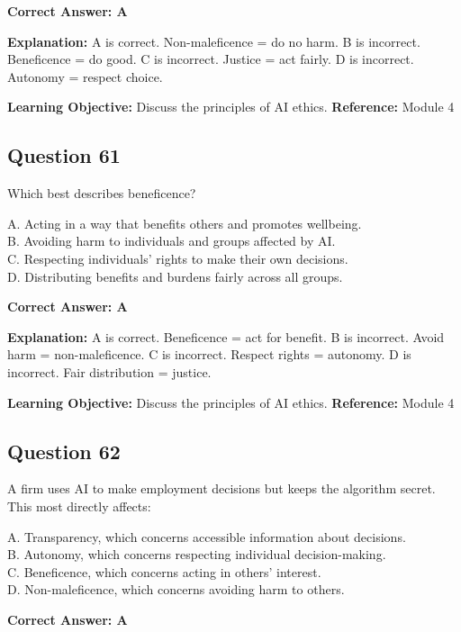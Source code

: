 \documentclass[11pt]{article}
\begin{document}
	\vspace{0.4em}
	\textbf{Correct Answer: A}
	
	\textbf{Explanation:}
	A is correct. Non-maleficence = do no harm.
	B is incorrect. Beneficence = do good.
	C is incorrect. Justice = act fairly.
	D is incorrect. Autonomy = respect choice.
	
	\textbf{Learning Objective:} Discuss the principles of AI ethics.
	\textbf{Reference:} Module 4
	
	\subsection*{Question 61}
	Which best describes beneficence?
	
	A. Acting in a way that benefits others and promotes wellbeing.\\
	B. Avoiding harm to individuals and groups affected by AI.\\
	C. Respecting individuals' rights to make their own decisions.\\
	D. Distributing benefits and burdens fairly across all groups.
	
	\vspace{0.4em}
	\textbf{Correct Answer: A}
	
	\textbf{Explanation:}
	A is correct. Beneficence = act for benefit.
	B is incorrect. Avoid harm = non-maleficence.
	C is incorrect. Respect rights = autonomy.
	D is incorrect. Fair distribution = justice.
	
	\textbf{Learning Objective:} Discuss the principles of AI ethics.
	\textbf{Reference:} Module 4
	
	\subsection*{Question 62}
	A firm uses AI to make employment decisions but keeps the algorithm
	secret. This most directly affects:
	
	A. Transparency, which concerns accessible information about decisions.\\
	B. Autonomy, which concerns respecting individual decision-making.\\
	C. Beneficence, which concerns acting in others' interest.\\
	D. Non-maleficence, which concerns avoiding harm to others.
	
	\vspace{0.4em}
	\textbf{Correct Answer: A}
	
\end{document}
